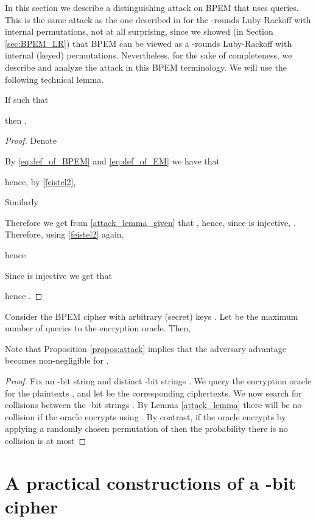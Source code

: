 \documentclass{llncs}
\begin{document}
In this section we describe a distinguishing attack on BPEM that uses  queries. This is the same attack as the one described in 
\cite[Section 3.2]{TP} for the -rounds Luby-Rackoff with internal permutations, not at all surprising, since we showed (in Section \ref{sec:BPEM_LR}) that BPEM can be viewed as a -rounds Luby-Rackoff with internal (keyed) permutations. Nevertheless, for the sake of completeness, we describe and analyze the attack in this BPEM terminology.
We will use the following technical lemma.
\begin{lemma}\label{attack_lemma}
If  such that

then .
\end{lemma}
\begin{proof}
Denote

By \eqref{eq:def_of_BPEM} and \eqref{eq:def_of_EM} we have that

hence, by \eqref{feistel2},

Similarly

Therefore we get from \eqref{attack_lemma_given} that , hence, since  is injective, . Therefore, using \eqref{feistel2} again,

hence

Since  is injective we get that

hence .
\end{proof}
\begin{proposition}\label{propos:attack}
Consider the BPEM cipher  with arbitrary (secret) keys
.
Let  be the maximum number of queries to the encryption oracle. Then,

\end{proposition}
\begin{remark}
Note that Proposition \ref{propos:attack} implies that the adversary advantage becomes non-negligible for .
\end{remark}
\begin{proof}
 Fix an -bit string  and  distinct -bit strings . We query the encryption oracle for the plaintexts , and let  be the corresponding ciphertexts. We now search for collisions between the  -bit strings .
By Lemma \ref{attack_lemma} there will be no collision if the oracle encrypts using . By contrast, if the oracle encrypts by applying a randomly chosen permutation of  then the probability there is no collision is at most

\end{proof}

\section{A practical constructions of a -bit cipher}
\label{sec:practical}
\end{document}

